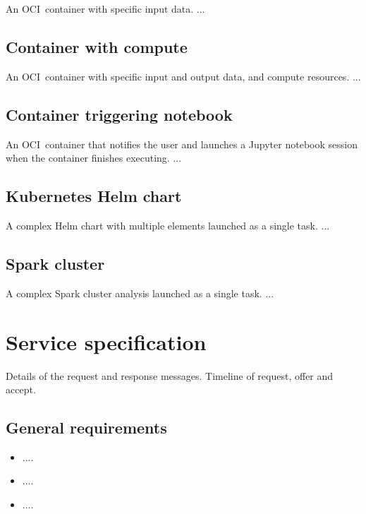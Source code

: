 \documentclass[11pt,a4paper]{ivoa}
\newcommand{\jupyternotebook} {Jupyter notebook}
\newcommand{\ocicontainer} {OCI~container}
\begin{document}
An \ocicontainer{} with specific input data.
...

\subsection{Container with compute}
\label{container-with-compute}

An \ocicontainer{} with specific input and output data, and compute resources.
...

\subsection{Container triggering notebook}
\label{container-triggering-notebook}

An \ocicontainer{} that notifies the user and launches a \jupyternotebook{} session
when the container finishes executing.
...

\subsection{Kubernetes Helm chart}
\label{kubernetes-helm}

A complex Helm chart with multiple elements launched as a single task.
...

\subsection{Spark cluster}
\label{spark-cluster}

A complex Spark cluster analysis launched as a single task.
...

\pagebreak

\section{Service specification}
\label{service-specification}

Details of the request and response messages.
Timeline of request, offer and accept.

\subsection{General requirements}
\label{general-requirements}

\begin{itemize}
    \item ....
    \item ....
    \item ....
\end{itemize}
\end{document}
